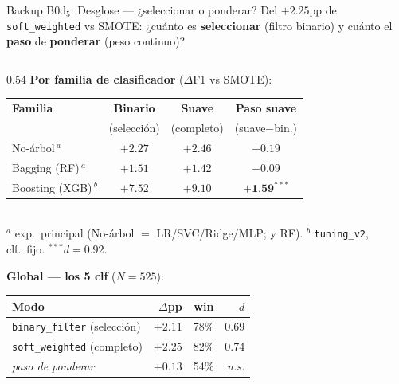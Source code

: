 \begin{frame}{Backup B0d$_5$: Desglose --- ¿seleccionar o ponderar?}
\small
Del \alert{$+2{.}25$pp} de \texttt{soft\_weighted} vs SMOTE: ¿cuánto es \textbf{seleccionar} (filtro binario) y cuánto el \textbf{paso} de \textbf{ponderar} (peso continuo)?

\vspace{0.2em}
\begin{columns}[T]

\begin{column}{0.54\textwidth}
\scriptsize
\textbf{Por familia de clasificador} ($\Delta$F1 vs SMOTE):\\[2pt]
\setlength{\tabcolsep}{3.5pt}
\renewcommand{\arraystretch}{1.12}
\begin{tabular}{@{}lccc@{}}
\toprule
\textbf{Familia} & \textbf{Binario} & \textbf{Suave} & \textbf{Paso suave} \\
                 & (selección)     & (completo)     & (suave$-$bin.) \\
\midrule
No-árbol\,$^a$        & $+2{.}27$ & $+2{.}46$ & $+0{.}19$ \\
\rowcolor{uaiorange!10}
Bagging (RF)\,$^a$    & $+1{.}51$ & $+1{.}42$ & \textcolor{red!70!black}{$-0{.}09$} \\
\rowcolor{uaigreen!14}
Boosting (XGB)\,$^b$  & $+7{.}52$ & \alert{$+9{.}10$} & \alert{$\boldsymbol{+1{.}59}$}$^{***}$ \\
\bottomrule
\end{tabular}\\[1pt]
{\tiny $^a$ exp.\ principal (No-árbol $=$ LR/SVC/Ridge/MLP; y RF). $^b$ \texttt{tuning\_v2}, clf.\ fijo. $^{***}d{=}0.92$.}

\vspace{0.35em}
\textbf{Global --- los 5 clf} ($N{=}525$):\\[2pt]
\setlength{\tabcolsep}{5pt}
\renewcommand{\arraystretch}{1.05}
\begin{tabular}{@{}lrrr@{}}
\toprule
Modo & $\Delta$pp & win & $d$ \\
\midrule
\texttt{binary\_filter} (selección) & $+2{.}11$ & 78\% & 0.69 \\
\rowcolor{uaigreen!12}
\texttt{soft\_weighted} (completo)  & \alert{$+2{.}25$} & 82\% & 0.74 \\
\textit{paso de ponderar}           & $+0{.}13$ & 54\% & \textit{n.s.} \\
\bottomrule
\end{tabular}
\end{column}


\end{columns}
\end{frame}
